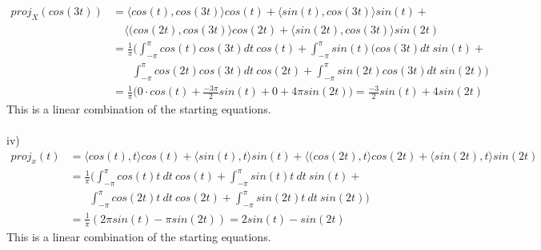 \documentclass[letterpaper,12pt]{article}
\theoremstyle{definition}
\begin{document}
\begin{align*}
proj_X(cos(3t)) &= \langle  cos(t),cos(3t)\rangle   cos(t)+\langle  sin(t),cos(3t)\rangle   sin(t)+\\ 
&~~~~~\langle  (cos(2t),cos(3t)\rangle   cos(2t) +\langle  sin(2t),cos(3t)\rangle   sin(2t)\\
&=\frac{1}{\pi}\bigg(\int^\pi_{-\pi}cos(t)cos(3t)dt ~cos(t)+\int^\pi_{-\pi}sin(t)(cos(3t)dt ~sin(t)+\\ 
&~~~~~~~~\int^\pi_{-\pi}cos(2t)cos(3t)dt~cos(2t)+ \int^\pi_{-\pi}sin(2t)cos(3t)dt~sin(2t)\bigg)\\
&=\frac{1}{\pi}\big(0 \cdot cos(t)+\frac{-3\pi}{2}sin(t)+0+4\pi sin(2t)\big)=\frac{-3}{2}sin(t)+ 4sin(2t)
\end{align*}
This is a linear combination of the starting equations.\\ \\
iv)
\begin{align*}
proj_{x}(t) &= \langle cos(t),t\rangle cos(t)+\langle  sin(t),t\rangle sin(t) + \langle  (cos(2t),t\rangle   cos(2t) +\langle  sin(2t),t\rangle   sin(2t)\\
&=\frac{1}{\pi}\bigg(\int^\pi_{-\pi}cos(t)t~dt ~cos(t)+\int^\pi_{-\pi}sin(t)t~dt ~sin(t)+\\ 
&~~~~~~~~\int^\pi_{-\pi}cos(2t)t~dt~cos(2t)+ \int^\pi_{-\pi}sin(2t)t~dt~sin(2t)\bigg) \\
&=\frac{1}{\pi}(2\pi sin(t)-\pi sin(2t))=2sin(t)-sin(2t)
\end{align*}
This is a linear combination of the starting equations.
\end{document}
